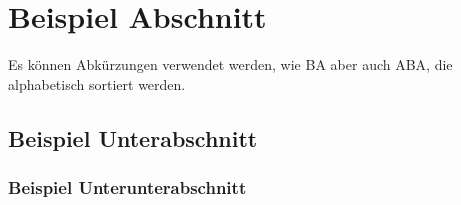 \section{Beispiel Abschnitt}

Es können Abkürzungen verwendet werden, wie \ac{BA} aber auch \ac{ABA}, die alphabetisch sortiert werden.

\subsection{Beispiel Unterabschnitt}

\subsubsection{Beispiel Unterunterabschnitt}

\Blindtext{}